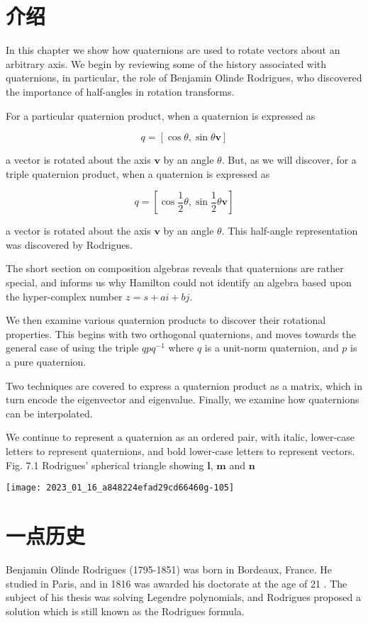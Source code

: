 \section{介绍}
In this chapter we show how quaternions are used to rotate vectors about an arbitrary axis. We begin by reviewing some of the history associated with quaternions, in particular, the role of Benjamin Olinde Rodrigues, who discovered the importance of half-angles in rotation transforms.

For a particular quaternion product, when a quaternion is expressed as

$$
q=[\cos \theta, \sin \theta \mathbf{v}]
$$

a vector is rotated about the axis $\mathbf{v}$ by an angle $\theta$. But, as we will discover, for a triple quaternion product, when a quaternion is expressed as

$$
q=\left[\cos \frac{1}{2} \theta, \sin \frac{1}{2} \theta \mathbf{v}\right]
$$

a vector is rotated about the axis $\mathbf{v}$ by an angle $\theta$. This half-angle representation was discovered by Rodrigues.

The short section on composition algebras reveals that quaternions are rather special, and informs us why Hamilton could not identify an algebra based upon the hyper-complex number $z=s+a i+b j$.

We then examine various quaternion products to discover their rotational properties. This begins with two orthogonal quaternions, and moves towards the general case of using the triple $q p q^{-1}$ where $q$ is a unit-norm quaternion, and $p$ is a pure quaternion.

Two techniques are covered to express a quaternion product as a matrix, which in turn encode the eigenvector and eigenvalue. Finally, we examine how quaternions can be interpolated.

We continue to represent a quaternion as an ordered pair, with italic, lower-case letters to represent quaternions, and bold lower-case letters to represent vectors. Fig. 7.1 Rodrigues' spherical triangle showing $\mathbf{l}$, $\mathbf{m}$ and $\mathbf{n}$

\begin{center}
\texttt{[image: 2023\_01\_16\_a848224efad29cd66460g-105]}
\end{center}

\section{一点历史}
Benjamin Olinde Rodrigues (1795-1851) was born in Bordeaux, France. He studied in Paris, and in 1816 was awarded his doctorate at the age of 21 . The subject of his thesis was solving Legendre polynomials, and Rodrigues proposed a solution which is still known as the Rodrigues formula.

